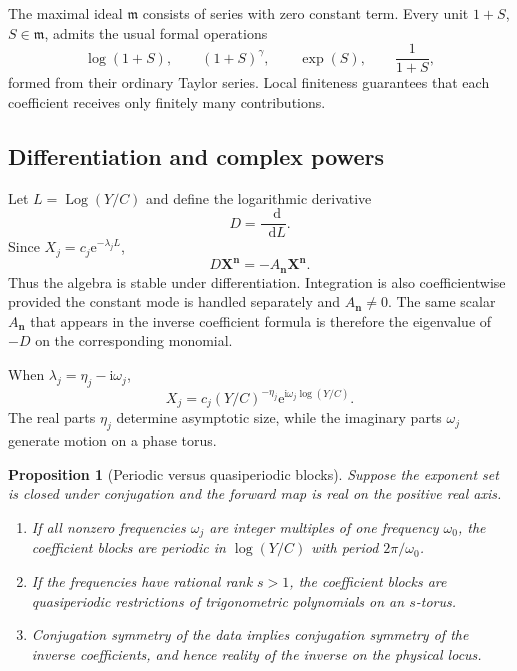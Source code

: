\documentclass[11pt,oneside]{article}
\theoremstyle{plain}
\newtheorem{proposition}[theorem]{Proposition}
\theoremstyle{definition}
\theoremstyle{remark}
\newcommand{\e}{\mathrm{e}}
\newcommand{\ii}{\mathrm{i}}
\newcommand{\dd}{\mathop{}\!\mathrm{d}}
\newcommand{\Log}{\operatorname{Log}}
\begin{document}
The maximal ideal \(\mathfrak m\) consists of series with zero constant term.
Every unit \(1+S\), \(S\in\mathfrak m\), admits the usual formal operations
\begin{equation}
 \log(1+S),\qquad (1+S)^\gamma,
 \qquad \exp(S),\qquad \frac1{1+S},
 \label{eq:unit-operations}
\end{equation}
formed from their ordinary Taylor series.  Local finiteness guarantees that
each coefficient receives only finitely many contributions.

\subsection{Differentiation and complex powers}

Let \(L=\Log(Y/C)\) and define the logarithmic derivative
\begin{equation}
 D=\frac{\dd}{\dd L}.
 \label{eq:D-log}
\end{equation}
Since \(X_j=c_j\e^{-\lambda_jL}\),
\begin{equation}
 D\bm X^{\bm n}=-A_{\bm n}\bm X^{\bm n}.
 \label{eq:D-monomial}
\end{equation}
Thus the algebra is stable under differentiation.  Integration is also
coefficientwise provided the constant mode is handled separately and
\(A_{\bm n}\ne0\).  The same scalar \(A_{\bm n}\) that appears in the inverse
coefficient formula is therefore the eigenvalue of \(-D\) on the
corresponding monomial.

When \(\lambda_j=\eta_j-\ii\omega_j\),
\begin{equation}
 X_j=c_j(Y/C)^{-\eta_j}\e^{\ii\omega_j\log(Y/C)}.
 \label{eq:complex-power-phase}
\end{equation}
The real parts \(\eta_j\) determine asymptotic size, while the imaginary parts
\(\omega_j\) generate motion on a phase torus.

\begin{proposition}[Periodic versus quasiperiodic blocks]
\label{prop:periodic-quasiperiodic}
Suppose the exponent set is closed under conjugation and the forward map is
real on the positive real axis.
\begin{enumerate}
\item If all nonzero frequencies \(\omega_j\) are integer multiples of one
frequency \(\omega_0\), the coefficient blocks are periodic in
\(\log(Y/C)\) with period \(2\pi/\omega_0\).
\item If the frequencies have rational rank \(s>1\), the coefficient blocks
are quasiperiodic restrictions of trigonometric polynomials on an
\(s\)-torus.
\item Conjugation symmetry of the data implies conjugation symmetry of the
inverse coefficients, and hence reality of the inverse on the physical locus.
\end{enumerate}
\end{proposition}
\end{document}

